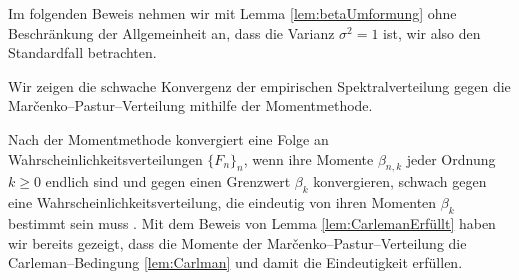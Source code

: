 \documentclass[../Bachelor_LennartKoliwer.tex]{subfiles}
\begin{document}
Im folgenden Beweis nehmen wir mit Lemma \ref{lem:betaUmformung} ohne Beschränkung der Allgemeinheit an, dass die Varianz $\sigma^2=1$ ist, wir also den Standardfall betrachten.

Wir zeigen die schwache Konvergenz der empirischen Spektralverteilung gegen die Mar\-\v{c}enko--Pastur--Verteilung mithilfe der Momentmethode.

Nach der Momentmethode konvergiert eine Folge an Wahrscheinlichkeitsverteilungen $\{F_n\}_n$, wenn ihre Momente $\beta_{n,k}$ jeder Ordnung $k\geq0$ endlich sind und gegen einen Grenzwert $\beta_k$ konvergieren, schwach gegen eine Wahrscheinlichkeitsverteilung, die eindeutig von ihren Momenten $\beta_k$ bestimmt sein muss \cite[507]{BaiSilverstein}.
Mit dem Beweis von Lemma \ref{lem:CarlemanErfüllt} haben wir bereits gezeigt, dass die Momente der Mar\v{c}enko--Pastur--Verteilung die Carleman--Bedingung \ref{lem:Carlman} und damit die Eindeutigkeit erfüllen.
\end{document}
